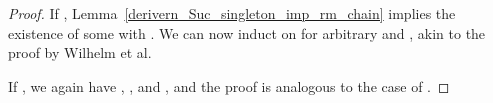 \begin{isabellebody}
\begin{isamarkuptext}
\begin{lemma}[Step 2]
\begin{proof}
If , Lemma~\ref{derivern_Suc_singleton_imp_rm_chain} implies the existence of some
\isa{{\isasymrho}} with .
We can now induct on \isa{{\isasymrho}} for arbitrary  and , akin to the proof by 
Wilhelm et al.

If \isa{\isafree{{\isasymrho}}\ {\isacharequal}{\kern0pt}\ {\isacharbrackleft}{\kern0pt}{\isacharbrackright}{\kern0pt}}, we again have , , and , and 
the proof is analogous to the case of .


\end{proof}
\end{lemma}
\end{isamarkuptext}
\end{isabellebody}
